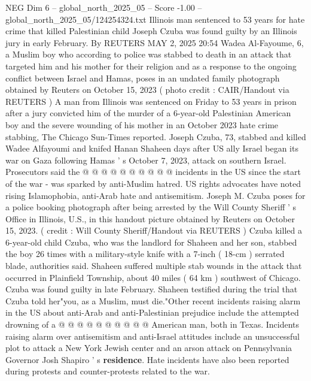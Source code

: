 \begin{textsample}{NEG Dim 6 – global\_north\_2025\_05 – Score -1.00 – global\_north\_2025\_05/124254324.txt}  \label{ex:f6_neg_413}
Illinois man sentenced to 53 years for hate crime that killed Palestinian child Joseph Czuba was found guilty by an Illinois jury in early February.
By REUTERS MAY 2, 2025 20:54 Wadea Al-Fayoume, 6, a Muslim boy who according to police was stabbed to death in an attack that targeted him and his mother for their religion and as a response to the ongoing conflict between Israel and Hamas, poses in an undated family photograph obtained by Reuters on October 15, 2023 ( photo credit : CAIR/Handout via REUTERS ) A man from Illinois was sentenced on Friday to 53 years in prison after a jury convicted him of the murder of a 6-year-old Palestinian American boy and the severe wounding of his mother in an October 2023 hate crime stabbing, The Chicago Sun-Times reported.
Joseph Czuba, 73, stabbed and killed Wadee Alfayoumi and knifed Hanan Shaheen days after US ally Israel began its war on Gaza following Hamas ' s October 7, 2023, attack on southern Israel.
Prosecutors said the @ @ @ @ @ @ @ @ @ @ incidents in the US since the start of the war - was sparked by anti-Muslim hatred.
US rights advocates have noted rising Islamophobia, anti-Arab hate and antisemitism.
Joseph M.
Czuba poses for a police booking photograph after being arrested by the Will County Sheriff ' s Office in Illinois, U.S., in this handout picture obtained by Reuters on October 15, 2023. ( credit : Will County Sheriff/Handout via REUTERS ) Czuba killed a 6-year-old child Czuba, who was the landlord for Shaheen and her son, stabbed the boy 26 times with a military-style knife with a 7-inch ( 18-cm ) serrated blade, authorities said.
Shaheen suffered multiple stab wounds in the attack that occurred in Plainfield Township, about 40 miles ( 64 km ) southwest of Chicago.
Czuba was found guilty in late February.
Shaheen testified during the trial that Czuba told her"you, as a Muslim, must die."Other recent incidents raising alarm in the US about anti-Arab and anti-Palestinian prejudice include the attempted drowning of a @ @ @ @ @ @ @ @ @ @ American man, both in Texas.
Incidents raising alarm over antisemitism and anti-Israel attitudes include an unsuccessful plot to attack a New York Jewish center and an arson attack on Pennsylvania Governor Josh Shapiro ' s \textbf{residence}.
Hate incidents have also been reported during protests and counter-protests related to the war.

\end{textsample}
